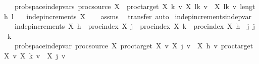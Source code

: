 \begin{isabellebody}
\ \ \ prob{\isacharunderscore}{\kern0pt}space{\isachardot}{\kern0pt}indep{\isacharunderscore}{\kern0pt}vars\ {\isacharparenleft}{\kern0pt}proc{\isacharunderscore}{\kern0pt}source\ X{\isacharparenright}{\kern0pt}\ {\isacharparenleft}{\kern0pt}{\isasymlambda}{\isacharunderscore}{\kern0pt}{\isachardot}{\kern0pt}\ proc{\isacharunderscore}{\kern0pt}target\ X{\isacharparenright}{\kern0pt}\ {\isacharparenleft}{\kern0pt}{\isasymlambda}k\ v{\isachardot}{\kern0pt}\ X\ {\isacharparenleft}{\kern0pt}l{\isacharbang}{\kern0pt}k{\isacharparenright}{\kern0pt}\ v\ {\isacharminus}{\kern0pt}\ X\ {\isacharparenleft}{\kern0pt}l{\isacharbang}{\kern0pt}{\isacharparenleft}{\kern0pt}k{\isacharminus}{\kern0pt}{}{\isacharparenright}{\kern0pt}{\isacharparenright}{\kern0pt}\ v{\isacharparenright}{\kern0pt}\ {\isacharbraceleft}{\kern0pt}{}{\isachardot}{\kern0pt}{\isachardot}{\kern0pt}{\isacharless}{\kern0pt}length\ l{\isacharbraceright}{\kern0pt}{\isachardoublequoteclose}\isanewline
\ \ \ {\isachardoublequoteopen}indep{\isacharunderscore}{\kern0pt}increments\ X{\isachardoublequoteclose}\isanewline
%
\isadelimproof
\ \ %
\endisadelimproof
%
\isatagproof
{}\isamarkupfalse%
\ assms\ \isamarkupfalse%
\ {\isacharparenleft}{\kern0pt}transfer{\isacharcomma}{\kern0pt}\ auto{\isacharparenright}{\kern0pt}%
\endisatagproof
{\isafoldproof}%
%
\isadelimproof
\isanewline
%
\endisadelimproof
\isanewline
{}\isamarkupfalse%
\ indep{\isacharunderscore}{\kern0pt}increments{\isacharunderscore}{\kern0pt}indep{\isacharunderscore}{\kern0pt}var{\isacharcolon}{\kern0pt}\isanewline
\ \ \ {\isachardoublequoteopen}indep{\isacharunderscore}{\kern0pt}increments\ X{\isachardoublequoteclose}\ {\isachardoublequoteopen}h\ {\isasymin}\ proc{\isacharunderscore}{\kern0pt}index\ X{\isachardoublequoteclose}\ {\isachardoublequoteopen}j\ {\isasymin}\ proc{\isacharunderscore}{\kern0pt}index\ X{\isachardoublequoteclose}\ {\isachardoublequoteopen}k\ {\isasymin}\ proc{\isacharunderscore}{\kern0pt}index\ X{\isachardoublequoteclose}\ {\isachardoublequoteopen}h\ {\isasymle}\ j{\isachardoublequoteclose}\ {\isachardoublequoteopen}j\ {\isasymle}\ k{\isachardoublequoteclose}\isanewline
\ \ \ {\isachardoublequoteopen}prob{\isacharunderscore}{\kern0pt}space{\isachardot}{\kern0pt}indep{\isacharunderscore}{\kern0pt}var\ {\isacharparenleft}{\kern0pt}proc{\isacharunderscore}{\kern0pt}source\ X{\isacharparenright}{\kern0pt}\ {\isacharparenleft}{\kern0pt}proc{\isacharunderscore}{\kern0pt}target\ X{\isacharparenright}{\kern0pt}\ {\isacharparenleft}{\kern0pt}{\isasymlambda}v{\isachardot}{\kern0pt}\ X\ j\ v\ {\isacharminus}{\kern0pt}\ X\ h\ v{\isacharparenright}{\kern0pt}\ {\isacharparenleft}{\kern0pt}proc{\isacharunderscore}{\kern0pt}target\ X{\isacharparenright}{\kern0pt}\ {\isacharparenleft}{\kern0pt}{\isasymlambda}v{\isachardot}{\kern0pt}\ X\ k\ v\ {\isacharminus}{\kern0pt}\ X\ j\ v{\isacharparenright}{\kern0pt}{\isachardoublequoteclose}\isanewline

\end{isabellebody}
